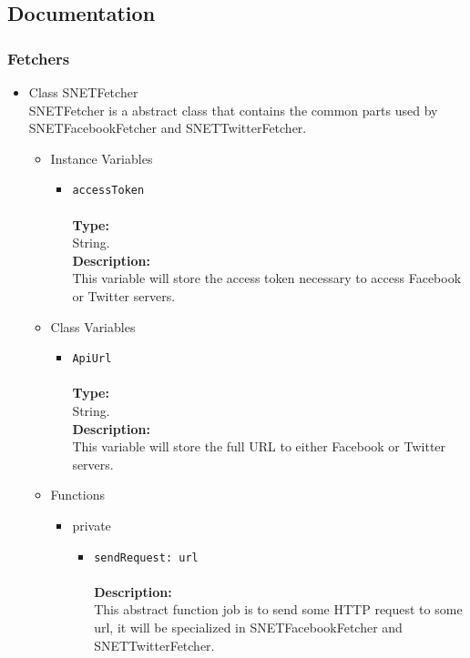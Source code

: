\subsection{Documentation}
\label{sec-1-4}
\subsubsection{Fetchers}
\label{sec-1-4-1}
\begin{itemize}

\item Class SNETFetcher\\
\label{sec-1-4-1-1}%
SNETFetcher is a abstract class that contains the common parts used by SNETFacebookFetcher and SNETTwitterFetcher.

\begin{itemize}

\item Instance Variables
\label{sec-1-4-1-1-1}%
\begin{itemize}
\item \verb~accessToken~\\\\
\textbf{Type:}\\
     String.\\

     \textbf{Description:}\\
     This variable will store the access token necessary to access Facebook or Twitter servers.
\end{itemize}


\item Class Variables
\label{sec-1-4-1-1-2}%
\begin{itemize}
\item \verb~ApiUrl~\\\\
\textbf{Type:}\\
     String.\\

     \textbf{Description:}\\
     This variable will store the full URL to either Facebook or Twitter servers.
\end{itemize}


\item Functions
\label{sec-1-4-1-1-3}%
\begin{itemize}

\item private
\label{sec-1-4-1-1-3-1}%
\begin{itemize}
\item \verb~sendRequest: url~\\\\
\textbf{Description:}\\
      This abstract function job is to send some HTTP request to some url, it will be specialized in SNETFacebookFetcher and SNETTwitterFetcher.
\end{itemize}



\end{itemize}
\end{itemize}
\end{itemize}
